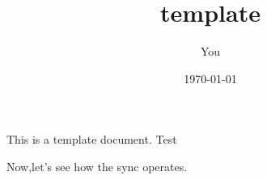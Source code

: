 \documentclass[12pt]{article}
\author{You}
\date{\today}
\title{template}
\begin{document}
This is a template document. Test

Now,let's see how the sync operates.
\end{document}
